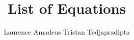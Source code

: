 \documentclass[a4paper]{article}
\title{List of Equations}
\author{Laurence Amadeus Tristan Tedjapradipta}
\begin{document}
\maketitle
\pagebreak


\end{document}
